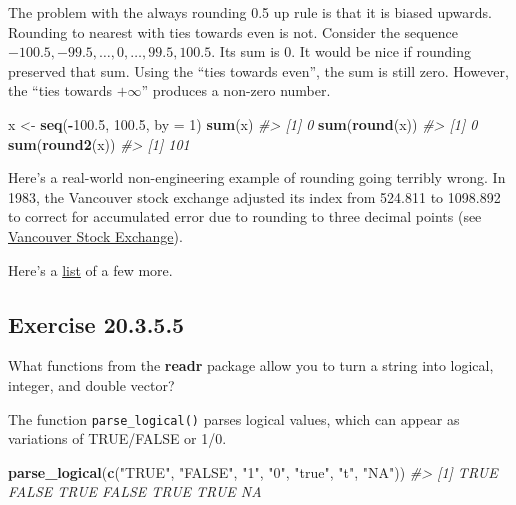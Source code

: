 \documentclass[]{book}
\newenvironment{Shaded}{\begin{snugshade}}{\end{snugshade}}
\newcommand{\CommentTok}[1]{\textcolor[rgb]{0.56,0.35,0.01}{\textit{#1}}}
\newcommand{\DataTypeTok}[1]{\textcolor[rgb]{0.13,0.29,0.53}{#1}}
\newcommand{\DecValTok}[1]{\textcolor[rgb]{0.00,0.00,0.81}{#1}}
\newcommand{\FloatTok}[1]{\textcolor[rgb]{0.00,0.00,0.81}{#1}}
\newcommand{\KeywordTok}[1]{\textcolor[rgb]{0.13,0.29,0.53}{\textbf{#1}}}
\newcommand{\NormalTok}[1]{#1}
\newcommand{\OperatorTok}[1]{\textcolor[rgb]{0.81,0.36,0.00}{\textbf{#1}}}
\newcommand{\StringTok}[1]{\textcolor[rgb]{0.31,0.60,0.02}{#1}}
\theoremstyle{plain}
\theoremstyle{remark}
\begin{document}
The problem with the always rounding 0.5 up rule is that it is biased upwards. Rounding to nearest with ties towards even is
not.
Consider the sequence \(-100.5, -99.5, \dots, 0, \dots, 99.5, 100.5\).
Its sum is 0.
It would be nice if rounding preserved that sum.
Using the ``ties towards even'', the sum is still zero.
However, the ``ties towards \(+\infty\)'' produces a non-zero number.

\begin{Shaded}
\begin{Highlighting}[]
\NormalTok{x <-}\StringTok{ }\KeywordTok{seq}\NormalTok{(}\OperatorTok{-}\FloatTok{100.5}\NormalTok{, }\FloatTok{100.5}\NormalTok{, }\DataTypeTok{by =} \DecValTok{1}\NormalTok{)}
\KeywordTok{sum}\NormalTok{(x)}
\CommentTok{#> [1] 0}
\KeywordTok{sum}\NormalTok{(}\KeywordTok{round}\NormalTok{(x))}
\CommentTok{#> [1] 0}
\KeywordTok{sum}\NormalTok{(}\KeywordTok{round2}\NormalTok{(x))}
\CommentTok{#> [1] 101}
\end{Highlighting}
\end{Shaded}

Here's a real-world non-engineering example of rounding going terribly wrong.
In 1983, the Vancouver stock exchange adjusted its index from 524.811 to 1098.892 to correct for accumulated error due to rounding to three decimal points (see \href{https://en.wikipedia.org/wiki/Vancouver_Stock_Exchange}{Vancouver Stock Exchange}).

Here's a \href{https://web.ma.utexas.edu/users/arbogast/misc/disasters.html}{list} of a few more.

\hypertarget{exercise-20.3.5.5}{%
\subsection*{\texorpdfstring{Exercise {20.3.5.5}}{Exercise 20.3.5.5}}\label{exercise-20.3.5.5}}

What functions from the \textbf{readr} package allow you to turn a string into logical, integer, and double vector?

The function \texttt{parse\_logical()} parses logical values, which can appear
as variations of TRUE/FALSE or 1/0.

\begin{Shaded}
\begin{Highlighting}[]
\KeywordTok{parse_logical}\NormalTok{(}\KeywordTok{c}\NormalTok{(}\StringTok{"TRUE"}\NormalTok{, }\StringTok{"FALSE"}\NormalTok{, }\StringTok{"1"}\NormalTok{, }\StringTok{"0"}\NormalTok{, }\StringTok{"true"}\NormalTok{, }\StringTok{"t"}\NormalTok{, }\StringTok{"NA"}\NormalTok{))}
\CommentTok{#> [1]  TRUE FALSE  TRUE FALSE  TRUE  TRUE    NA}
\end{Highlighting}
\end{Shaded}
\end{document}
